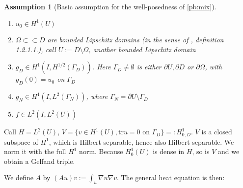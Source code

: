 \documentclass[english,a4paper,10pt,oneside]{scrbook}	%
\theoremstyle{break}
\newtheorem{ass}[equation]{Assumption}
\newtheorem{pb}[equation]{Problem}
\theoremstyle{remark}
\newcommand{\tr}{\text{tr}}
\newcommand{\cc}{\subset\subset}
\begin{document}
\begin{appendices}
\begin{ass}[Basic assumption for the well-posedness of \cref{pb:mix}]
\label{ass:basic_par_mix}
\textcolor{white}{ }
\begin{enumerate}
	\item $u_0 \in H^1(U)$
	\item $\Omega \cc D$ are bounded Lipschitz domains (in the sense of \cite{grisvard}, definition 1.2.1.1.), call $U:=D\setminus \overline{\Omega}$, another bounded Lipschitz domain
	\item $g_D \in H^1(I, H^{1/2}(\Gamma_D))$. Here $\Gamma_D\neq \emptyset$ is either $\partial U, \partial D $ or $\partial \Omega$, with $g_D(0) = u_0$ on $\Gamma_D$
	\item $g_N \in H^1(I, L^2(\Gamma_N))$, where $\Gamma_N = \partial U \setminus \Gamma_D$
	\item $f \in L^2(I, L^2(U))$
\end{enumerate}
\end{ass}



Call $H=L^2(U)$, $V=\{ v \in H^1(U), \tr u = 0 \text{ on } \Gamma_D\}=:H^1_{0,D}$. $V$ is a closed subspace of $H^1$, which is Hilbert separable, hence also Hilbert separable. We norm it with the full $H^1$ norm. Because $H^1_0(U)$ is dense in $H$, so is $V$ and we obtain a Gelfand triple. 


We define $A$ by $(Au)v:=\int_u\nabla u \nabla v$. The general heat equation is then:
%
%
%
%
%


\end{appendices}
\end{document}
